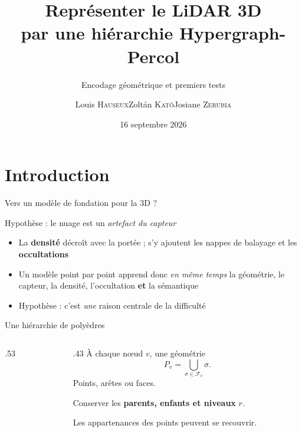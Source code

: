 \documentclass[svgnames,11pt,aspectratio=169]{beamer}
\title{Représenter le LiDAR 3D\\par une hiérarchie Hypergraph-Percol}
\subtitle{Encodage géométrique et premiers tests}
\author{\texorpdfstring{Louis \textsc{Hauseux}\quad Zoltán \textsc{Kató}\quad Josiane \textsc{Zerubia}}{Louis Hauseux, Zoltán Kató, Josiane Zerubia}}
\institute{Inria \& Szegedi Tudományegyetem}
\date[16 septembre 2026]{16 septembre 2026}
\newcommand{\partlabel}{}
\newcommand{\parttitle}{}
\newcommand{\presentationpart}[1]{%
  \section{#1}\gdef\partlabel{\Roman{section}.~#1}\gdef\parttitle{#1}%
  \begin{frame}\sectionpage\end{frame}}
\begin{document}
\begin{frame}[plain]\titlepage\end{frame}

\presentationpart{Introduction}

\begin{frame}[t]{Vers un modèle de fondation pour la 3D ?}
\begin{center}
\resizebox{.94\textwidth}{!}{}
\end{center}
\end{frame}

\begin{frame}{\fontsize{14}{17}\selectfont Hypothèse : le nuage est un \emph{artefact du capteur}}
    \setlength{\parskip}{0pt}
    \begin{center}
        \resizebox{0.72\textwidth}{!}{}
    \end{center}

    \vspace{-0.12cm}
    \small
    \begin{itemize}
        \setlength{\itemsep}{5pt}
        \item La \textbf{densité} décroît avec la portée ; s'y ajoutent les nappes de balayage
        et les \textbf{occultations}
        \item Un modèle point par point apprend donc \emph{en même temps} la géométrie, le capteur,
        la densité, l'occultation \textbf{et} la sémantique
        \item Hypothèse : c'est \emph{une} raison centrale de la difficulté
    \end{itemize}
\end{frame}

\begin{frame}{Une hiérarchie de polyèdres }
\begin{columns}[c,onlytextwidth]
\begin{column}{.53\textwidth}\centering
\resizebox{.94\linewidth}{!}{}
\end{column}
\begin{column}{.43\textwidth}
À chaque nœud $v$, une géométrie
\[
P_v=\bigcup_{\sigma\in\mathcal F_v}\sigma.
\]
Points, arêtes ou faces.\par\medskip
Conserver les \textbf{parents, enfants et niveaux} $r$.\par\medskip
{\small Les appartenances des points peuvent se recouvrir.}
\end{column}
\end{columns}
\end{frame}
\end{document}
